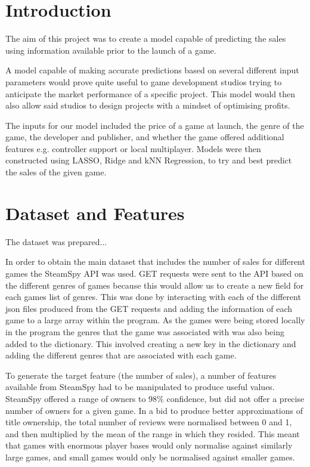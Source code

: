 \section{Introduction}
The aim of this project was to create a model capable of predicting the sales using information available prior to the launch of a game.

A model capable of making accurate predictions based on several different input parameters would prove quite useful to game development studios trying to anticipate the market performance of a specific project. This model would then also allow said studios to design projects with a mindset of optimising profits. 

The inputs for our model included the price of a game at launch, the genre of the game, the developer and publisher, and whether the game offered additional features e.g. controller support or local multiplayer. Models were then constructed using LASSO, Ridge and kNN Regression, to try and best predict the sales of the given game.

\section{Dataset and Features}
The dataset was prepared...

In order to obtain the main dataset that includes the number of sales for different games the SteamSpy API was used. GET requests were sent to the API based on the different genres of games because this would allow us to create a new field for each games list of genres. This was done by interacting with each of the different json files produced from the GET requests and adding the information of each game to a large array within the program. As the games were being stored locally in the program the genres that the game was associated with was also being added to the dictionary. This involved creating a new key in the dictionary and adding the different genres that are associated with each game.

To generate the target feature (the number of sales), a number of features available from SteamSpy had to be manipulated to produce useful values. SteamSpy offered a range of owners to 98\% confidence, but did not offer a precise number of owners for a given game. In a bid to produce better approximations of title ownership, the total number of reviews were normalised between 0 and 1, and then multiplied by the mean of the range in which they resided.
This meant that games with enormous player bases would only normalise against similarly large games, and small games would only be normalised against smaller games.
 

